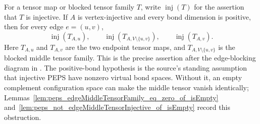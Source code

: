 \begin{theorem}%
    \label{thm:peps_edgeBlockedThreeSiteInjective}
    \leanok
    For a tensor map or blocked tensor family $T$, write
    $\operatorname{inj}(T)$ for the assertion that $T$ is injective. If $A$
    is vertex-injective and every bond dimension is positive, then for every
    edge $e=(u,v)$,
    \[
        \operatorname{inj}(T_{A,u}),\qquad
        \operatorname{inj}(T_{A,V\setminus\{u,v\}}),\qquad
        \operatorname{inj}(T_{A,v}).
    \]
    Here $T_{A,u}$ and $T_{A,v}$ are the two endpoint tensor maps, and
    $T_{A,V\setminus\{u,v\}}$ is the blocked middle tensor family. This is the
    precise assertion after the edge-blocking diagram in
    \cite[Section~3]{Molnar2018NormalPEPS}. The positive-bond hypothesis is the
    source's standing assumption that injective PEPS have nonzero virtual bond
    spaces. Without it, an empty complement configuration space can make the
    middle tensor vanish identically;
    Lemmas~\ref{lem:peps_edgeMiddleTensorFamily_eq_zero_of_isEmpty}
    and~\ref{lem:peps_not_edgeMiddleTensorInjective_of_isEmpty} record
    this obstruction.
\end{theorem}
